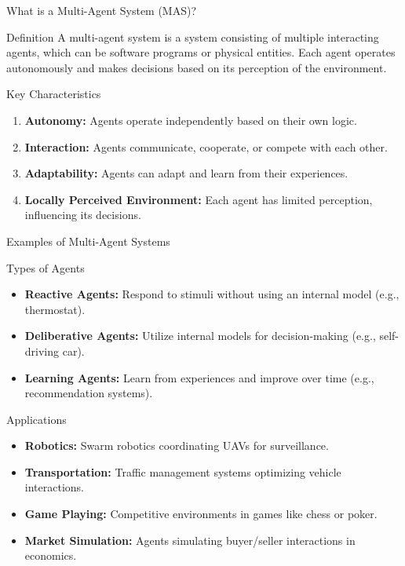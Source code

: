 \documentclass[aspectratio=169]{beamer}
\begin{document}
\begin{frame}[fragile]{What is a Multi-Agent System (MAS)?}
  \begin{block}{Definition}
    A multi-agent system is a system consisting of multiple interacting agents, which can be software programs or physical entities. Each agent operates autonomously and makes decisions based on its perception of the environment.
  \end{block}
  
  \begin{block}{Key Characteristics}
    \begin{enumerate}
      \item \textbf{Autonomy:} Agents operate independently based on their own logic.
      \item \textbf{Interaction:} Agents communicate, cooperate, or compete with each other.
      \item \textbf{Adaptability:} Agents can adapt and learn from their experiences.
      \item \textbf{Locally Perceived Environment:} Each agent has limited perception, influencing its decisions.
    \end{enumerate}
  \end{block}
\end{frame}

\begin{frame}[fragile]{Examples of Multi-Agent Systems}
  \begin{block}{Types of Agents}
    \begin{itemize}
      \item \textbf{Reactive Agents:} Respond to stimuli without using an internal model (e.g., thermostat).
      \item \textbf{Deliberative Agents:} Utilize internal models for decision-making (e.g., self-driving car).
      \item \textbf{Learning Agents:} Learn from experiences and improve over time (e.g., recommendation systems).
    \end{itemize}
  \end{block}
  
  \begin{block}{Applications}
    \begin{itemize}
      \item \textbf{Robotics:} Swarm robotics coordinating UAVs for surveillance.
      \item \textbf{Transportation:} Traffic management systems optimizing vehicle interactions.
      \item \textbf{Game Playing:} Competitive environments in games like chess or poker.
      \item \textbf{Market Simulation:} Agents simulating buyer/seller interactions in economics.
    \end{itemize}
  \end{block}
\end{frame}
\end{document}
